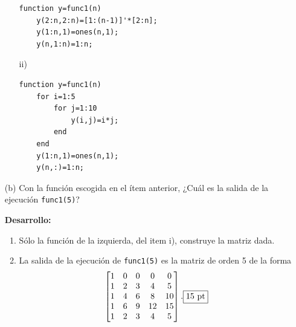 \documentclass[11pt]{article}
\begin{document}
\begin{enumerate}
\begin{multicols}{2}
\begin{enumerate}
    \vspace{3mm}
    \begin{lstlisting}
function y=func1(n)
    y(2:n,2:n)=[1:(n-1)]'*[2:n];
    y(1:n,1)=ones(n,1);
    y(n,1:n)=1:n;
    \end{lstlisting}
  
    \vspace{1.5cm}
    
    \item[ii) ]
    
    \vspace{3mm}
        \begin{lstlisting}
function y=func1(n)
    for i=1:5
        for j=1:10
            y(i,j)=i*j;
        end
    end
    y(1:n,1)=ones(n,1);
    y(n,:)=1:n;
    \end{lstlisting}
    \end{enumerate}
    \end{multicols}
    
    (b) Con la funci\'on escogida en el \'item anterior, ¿Cu\'al es la salida de la ejecuci\'on \texttt{func1(5)}?

\textbf{Desarrollo:}
\begin{enumerate}
	\item S\'olo la funci\'on  de la izquierda, del item i), construye la matriz dada. \fbox{10 pt}
    \item La salida de la ejecuci\'on de \texttt{func1(5)} es la matriz de orden 5 de la forma
    $$
    \begin{bmatrix}
    1 & 0 & 0 & 0 & 0  \\1 & 2 & 3 & 4 & 5  \\1 & 4 & 6 & 8 & 10  \\1 & 6 & 9 & 12 & 15  \\1 & 2 & 3 & 4 & 5  
    \end{bmatrix}. \fbox{15 pt}
    $$
    
    \end{enumerate}


\end{enumerate}
\end{document}
